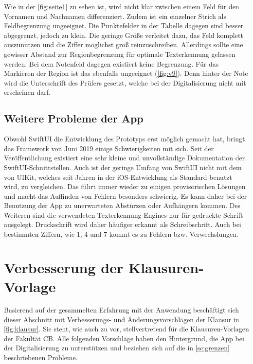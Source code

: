 \documentclass[notables, nomenclature, oneside, 150]{HSMW-Thesis}
\begin{document}
			Wie in der \autoref{fig:seite1} zu sehen ist, wird nicht klar zwischen einem Feld für den Vornamen und Nachnamen differenziert. Zudem ist ein einzelner Strich als Feldbegrenzung ungeeignet. Die Punktefelder in der Tabelle dagegen sind besser abgegrenzt, jedoch zu klein. Die geringe Größe verleitet dazu, das Feld komplett auszunutzen und die Ziffer möglichst groß reinzuschreiben. Allerdings sollte eine gewisser Abstand zur Regionbegrenzung für optimale Texterkennung gelassen werden. Bei dem Notenfeld dagegen existiert keine Begrenzung. Für das Markieren der Region ist das ebenfalls ungeeignet (\ref{fig:v9}). Denn hinter der Note wird die Unterschrift des Prüfers gesetzt, welche bei der Digitalisierung nicht mit erscheinen darf.

		\subsection{Weitere Probleme der App}
			Obwohl SwiftUI die Entwicklung des Prototyps erst möglich gemacht hat, bringt das Framework von Juni 2019 einige Schwierigkeiten mit sich. Seit der Veröffentlichung existiert eine sehr kleine und unvollständige Dokumentation der SwiftUI-Schnittstellen. Auch ist der geringe Umfang von SwiftUI nicht mit dem von UIKit, welches seit Jahren in der iOS-Entwicklung als Standard benutzt wird, zu vergleichen. Das führt immer wieder zu einigen provisorischen Lösungen und macht das Auffinden von Fehlern besonders schwierig. Es kann daher bei der Benutzung der App zu unerwarteten Abstürzen oder Aufhängern kommen. Des Weiteren sind die verwendeten Texterkennung-Engines nur für gedruckte Schrift ausgelegt. Druckschrift wird daher häufiger erkannt als Schreibschrift. Auch bei bestimmten Ziffern, wie 1, 4 und 7 kommt es zu Fehlern bzw. Verwechslungen.
	

	\section{Verbesserung der Klausuren-Vorlage}\label{sc:vorlage}
		Basierend auf der gesammelten Erfahrung mit der Anwendung beschäftigt sich dieser Abschnitt mit Verbesserungs- und Änderungsvorschlägen der Klausur in \autoref{fig:klausur}. Sie steht, wie auch zu vor, stellvertretend für die Klausuren-Vorlagen der Fakultät CB. Alle folgenden Vorschläge haben den Hintergrund, die App bei der Digitalisierung zu unterstützen und beziehen sich auf die in \autoref{sc:grenzen} beschriebenen Probleme.
	
\end{document}
